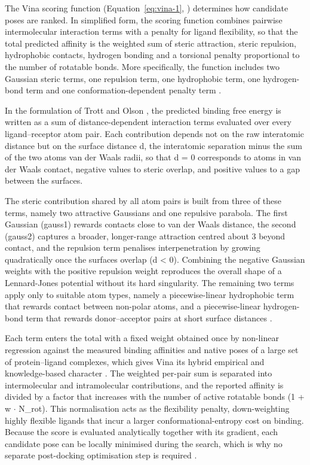 The Vina scoring function (Equation~\ref{eq:vina-1}, \cite[p.~2]{ref022}) determines how candidate poses are ranked. In simplified form, the scoring function combines pairwise intermolecular interaction terms with a penalty for ligand flexibility, so that the total predicted affinity is the weighted sum of steric attraction, steric repulsion, hydrophobic contacts, hydrogen bonding and a torsional penalty proportional to the number of rotatable bonds. More specifically, the function includes two Gaussian steric terms, one repulsion term, one hydrophobic term, one hydrogen-bond term and one conformation-dependent penalty term \cite{ref023}.

In the formulation of Trott and Olson \cite{ref022}, the predicted binding free energy is written as a sum of distance-dependent interaction terms evaluated over every ligand--receptor atom pair. Each contribution depends not on the raw interatomic distance but on the surface distance d, the interatomic separation minus the sum of the two atoms\textquotesingle{} van der Waals radii, so that d = 0 corresponds to atoms in van der Waals contact, negative values to steric overlap, and positive values to a gap between the surfaces.

The steric contribution shared by all atom pairs is built from three of these terms, namely two attractive Gaussians and one repulsive parabola. The first Gaussian (gauss1) rewards contacts close to van der Waals distance, the second (gauss2) captures a broader, longer-range attraction centred about 3\angstrom{} beyond contact, and the repulsion term penalises interpenetration by growing quadratically once the surfaces overlap (d \textless{} 0). Combining the negative Gaussian weights with the positive repulsion weight reproduces the overall shape of a Lennard-Jones potential without its hard singularity. The remaining two terms apply only to suitable atom types, namely a piecewise-linear hydrophobic term that rewards contact between non-polar atoms, and a piecewise-linear hydrogen-bond term that rewards donor--acceptor pairs at short surface distances \cite{ref022}.

Each term enters the total with a fixed weight obtained once by non-linear regression against the measured binding affinities and native poses of a large set of protein--ligand complexes, which gives Vina its hybrid empirical and knowledge-based character \cite{ref022}. The weighted per-pair sum is separated into intermolecular and intramolecular contributions, and the reported affinity is divided by a factor that increases with the number of active rotatable bonds (1 + w \ensuremath{\cdot} N\_rot). This normalisation acts as the flexibility penalty, down-weighting highly flexible ligands that incur a larger conformational-entropy cost on binding. Because the score is evaluated analytically together with its gradient, each candidate pose can be locally minimised during the search, which is why no separate post-docking optimisation step is required \cite{ref023}.

